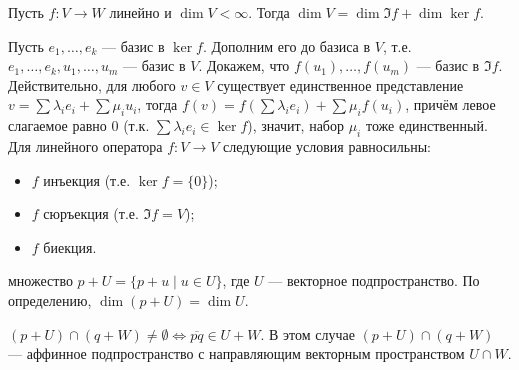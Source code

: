 \documentclass[12pt,a4paper]{article}
\begin{document}
\theorem Пусть $f:V\to W$ линейно и $\dim V<\infty$. Тогда $\dim V=\dim\Im f+\dim\ker f$.

\proof Пусть $e_1,\ldots ,e_k$ --- базис в $\ker f$. Дополним его до базиса в $V$, т.е. $e_1,\ldots ,e_k,u_1,\ldots ,u_m$ --- базис в $V$. Докажем, что $f(u_1),\ldots ,f(u_m)$ --- базис в $\Im f$. Действительно, для любого $v\in V$ существует единственное представление $v=\sum \lambda_ie_i+\sum \mu_iu_i$, тогда $f(v)=f(\sum \lambda_ie_i)+\sum \mu_if(u_i)$, причём левое слагаемое равно 0 (т.к. $\sum \lambda_ie_i\in\ker f$), значит, набор $\mu_i$ тоже единственный.\QEDA\\

\lemma Для линейного оператора $f:V\to V$ следующие условия равносильны:

\begin{itemize}
	\item $f$ инъекция (т.е. $\ker f=\{0\}$);
	\item $f$ сюръекция (т.е. $\Im f=V$);
	\item $f$ биекция.
\end{itemize}

 множество $p+U=\{p+u\mid u\in U\}$, где $U$ --- векторное подпространство. По определению, $\dim (p+U)=\dim U$.

\lemma $(p+U)\cap(q+W)\neq\emptyset\iff \overline{pq}\in U+W$. В этом случае $(p+U)\cap (q+W)$ --- аффинное подпространство с направляющим векторным пространством $U\cap W$.
\end{document}
